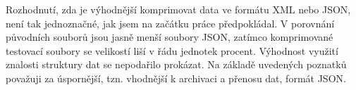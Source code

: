 Rozhodnutí, zda je výhodnější komprimovat data ve formátu XML nebo JSON, není tak jednoznačné, jak jsem na začátku práce předpokládal. V porovnání původních souborů jsou jasně menší soubory JSON, zatímco komprimované testovací soubory se velikostí liší v řádu jednotek procent. Výhodnost využití znalosti struktury dat se nepodařilo prokázat. Na základě uvedených poznatků považuji za úspornější, tzn. vhodnější k archivaci a přenosu dat, formát JSON.
